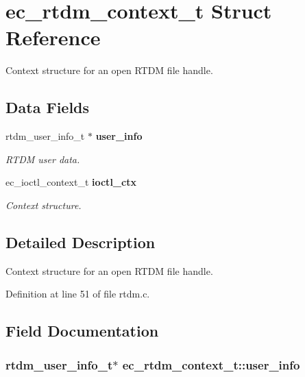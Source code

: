 \section{ec\-\_\-rtdm\-\_\-context\-\_\-t \-Struct \-Reference}
\label{structec__rtdm__context__t}


\-Context structure for an open \-R\-T\-D\-M file handle.  


\subsection*{\-Data \-Fields}
\begin{DoxyCompactItemize}
\item 
rtdm\-\_\-user\-\_\-info\-\_\-t $\ast$ {\bf user\-\_\-info}
\begin{DoxyCompactList}\small\item\em \-R\-T\-D\-M user data. \end{DoxyCompactList}\item 
ec\-\_\-ioctl\-\_\-context\-\_\-t {\bf ioctl\-\_\-ctx}
\begin{DoxyCompactList}\small\item\em \-Context structure. \end{DoxyCompactList}\end{DoxyCompactItemize}


\subsection{\-Detailed \-Description}
\-Context structure for an open \-R\-T\-D\-M file handle. 

\-Definition at line 51 of file rtdm.\-c.



\subsection{\-Field \-Documentation}
\subsubsection[{user\-\_\-info}]{\setlength{\rightskip}{0pt plus 5cm}rtdm\-\_\-user\-\_\-info\-\_\-t$\ast$ {\bf ec\-\_\-rtdm\-\_\-context\-\_\-t\-::user\-\_\-info}}\label{structec__rtdm__context__t_a062a354a243cbc0dddbfd9f440a68135}


